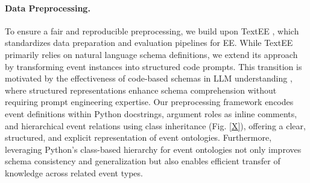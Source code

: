 \paragraph{Data Preprocessing.} 
To ensure a fair and reproducible preprocessing, we build upon TextEE \cite{textEE}, which standardizes data preparation and evaluation pipelines for EE. While TextEE primarily relies on natural language schema definitions, we extend its approach by transforming event instances into structured code prompts. This transition is motivated by the effectiveness of code-based schemas in LLM understanding \cite{wang2023code4struct}, where structured representations enhance schema comprehension without requiring prompt engineering expertise. Our preprocessing framework encodes event definitions within Python docstrings, argument roles as inline comments, and hierarchical event relations using class inheritance (Fig. \ref{X}), offering a clear, structured, and explicit representation of event ontologies. Furthermore, leveraging Python’s class-based hierarchy for event ontologies not only improves schema consistency and generalization but also enables efficient transfer of knowledge across related event types.




